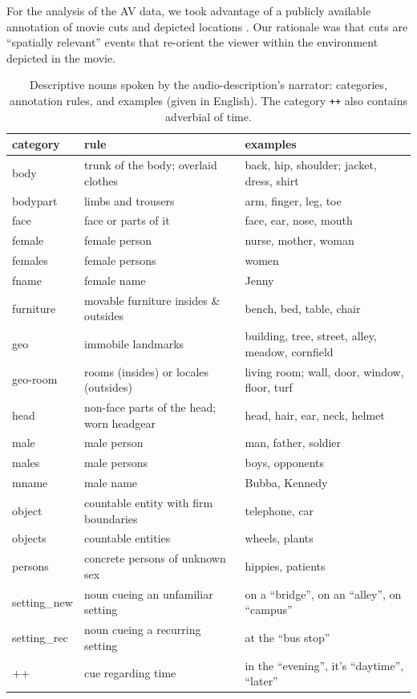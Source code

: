 \documentclass[english]{article}
\begin{document}
For the analysis of the AV data, we took advantage of a publicly available
annotation of movie cuts and depicted locations \citep{haeusler2016cutanno}.
Our rationale was that cuts are ``spatially relevant'' events that re-orient the
viewer within the environment depicted in the movie.


\begin{table}[t]
    \caption{Descriptive nouns spoken by the audio-description's narrator:
    categories, annotation rules, and examples (given in English). The category
    \texttt{++} also contains adverbial of time.}
\label{tab:descr-nouns-rules}
\begin{tabular}{lll}
\toprule
\textbf{category} & \textbf{rule} & \textbf{examples} \\
\midrule
body & trunk of the body; overlaid clothes & back, hip, shoulder; jacket, dress, shirt \tabularnewline
bodypart & limbs and trousers & arm, finger, leg, toe \tabularnewline
face & face or parts of it & face, ear, nose, mouth \tabularnewline
female & female person & nurse, mother, woman \tabularnewline
females & female persons & women \tabularnewline
fname & female name & Jenny \tabularnewline
furniture & movable furniture insides \& outsides & bench, bed, table, chair
\tabularnewline
geo & immobile landmarks & building, tree, street, alley, meadow, cornfield \tabularnewline
geo-room & rooms (insides) or  locales (outsides) & living room; wall, door, window, floor, turf \tabularnewline
head & non-face parts of the head; worn headgear & head, hair, ear, neck,
helmet \tabularnewline
male & male person & man, father, soldier \tabularnewline
males & male persons & boys, opponents \tabularnewline
mname & male name & Bubba, Kennedy \tabularnewline
object & countable entity with firm boundaries & telephone, car \tabularnewline
objects & countable entities & wheels, plants \tabularnewline
persons & concrete persons of unknown sex & hippies, patients \tabularnewline
setting\_new & noun cueing an unfamiliar setting &  on a ``bridge'', on an ``alley'', on ``campus'' \tabularnewline
setting\_rec & noun cueing a recurring setting & at the ``bus stop'' \tabularnewline
++ & cue regarding time & in the ``evening'', it's ``daytime'', ``later'' \tabularnewline

\bottomrule
\end{tabular}
\end{table}
\end{document}
